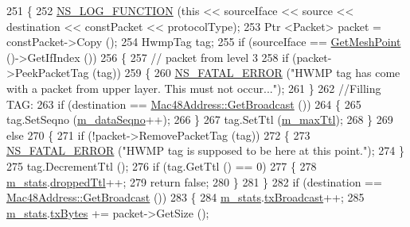 \begin{DoxyCode}
251 \{
252   \hyperlink{log-macros-disabled_8h_a90b90d5bad1f39cb1b64923ea94c0761}{NS\_LOG\_FUNCTION} (\textcolor{keyword}{this} << sourceIface << source << destination << constPacket << 
      protocolType);
253   Ptr <Packet> packet = constPacket->Copy ();
254   HwmpTag tag;
255   \textcolor{keywordflow}{if} (sourceIface == \hyperlink{classns3_1_1MeshL2RoutingProtocol_a630575428f626e58f0c8ac3fae24007e}{GetMeshPoint} ()->GetIfIndex ())
256     \{
257       \textcolor{comment}{// packet from level 3}
258       \textcolor{keywordflow}{if} (packet->PeekPacketTag (tag))
259         \{
260           \hyperlink{group__fatal_ga5131d5e3f75d7d4cbfd706ac456fdc85}{NS\_FATAL\_ERROR} (\textcolor{stringliteral}{"HWMP tag has come with a packet from upper layer. This must not
       occur..."});
261         \}
262       \textcolor{comment}{//Filling TAG:}
263       \textcolor{keywordflow}{if} (destination == \hyperlink{classns3_1_1Mac48Address_a55156e302c6bf950c0b558365adbde84}{Mac48Address::GetBroadcast} ())
264         \{
265           tag.SetSeqno (\hyperlink{classns3_1_1dot11s_1_1HwmpProtocol_a3b6ff76d8b7440a1d56234404ea0935a}{m\_dataSeqno}++);
266         \}
267       tag.SetTtl (\hyperlink{classns3_1_1dot11s_1_1HwmpProtocol_aeb6a1f36357cb71cf8d41749f65a3edc}{m\_maxTtl});
268     \}
269   \textcolor{keywordflow}{else}
270     \{
271       \textcolor{keywordflow}{if} (!packet->RemovePacketTag (tag))
272         \{
273           \hyperlink{group__fatal_ga5131d5e3f75d7d4cbfd706ac456fdc85}{NS\_FATAL\_ERROR} (\textcolor{stringliteral}{"HWMP tag is supposed to be here at this point."});
274         \}
275       tag.DecrementTtl ();
276       \textcolor{keywordflow}{if} (tag.GetTtl () == 0)
277         \{
278           \hyperlink{classns3_1_1dot11s_1_1HwmpProtocol_a478a13e7ec9ca167a5b13b38237d17ae}{m\_stats}.\hyperlink{structns3_1_1dot11s_1_1HwmpProtocol_1_1Statistics_ae53d393593feddd05de8b1a68793237a}{droppedTtl}++;
279           \textcolor{keywordflow}{return} \textcolor{keyword}{false};
280         \}
281     \}
282   \textcolor{keywordflow}{if} (destination == \hyperlink{classns3_1_1Mac48Address_a55156e302c6bf950c0b558365adbde84}{Mac48Address::GetBroadcast} ())
283     \{
284       \hyperlink{classns3_1_1dot11s_1_1HwmpProtocol_a478a13e7ec9ca167a5b13b38237d17ae}{m\_stats}.\hyperlink{structns3_1_1dot11s_1_1HwmpProtocol_1_1Statistics_a49bb09b5b0893eebcc853b112afff30f}{txBroadcast}++;
285       \hyperlink{classns3_1_1dot11s_1_1HwmpProtocol_a478a13e7ec9ca167a5b13b38237d17ae}{m\_stats}.\hyperlink{structns3_1_1dot11s_1_1HwmpProtocol_1_1Statistics_a507c7a9383e255dd2402d42c8218b416}{txBytes} += packet->GetSize ();

\end{DoxyCode}

